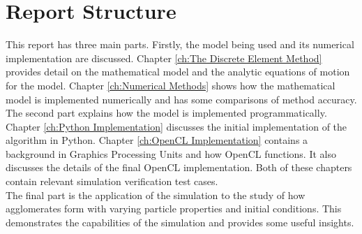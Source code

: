 \documentclass[10pt,a4paper,titlepage]{report}
\begin{document}
\section{Report Structure}
This report has three main parts. Firstly, the model being used and its numerical implementation are discussed. Chapter \ref{ch:The Discrete Element Method} provides detail on the mathematical model and the analytic equations of motion for the model. Chapter \ref{ch:Numerical Methods} shows how the mathematical model is implemented numerically and has some comparisons of method accuracy.
\\The second part explains how the model is implemented programmatically. Chapter \ref{ch:Python Implementation} discusses the initial implementation of the algorithm in Python. Chapter \ref{ch:OpenCL Implementation} contains a background in Graphics Processing Units and how OpenCL functions. It also discusses the details of the final OpenCL implementation. Both of these chapters contain relevant simulation verification test cases.
\\The final part is the application of the simulation to the study of how agglomerates form with varying particle properties and initial conditions. This demonstrates the capabilities of the simulation and provides some useful insights.
\end{document}
